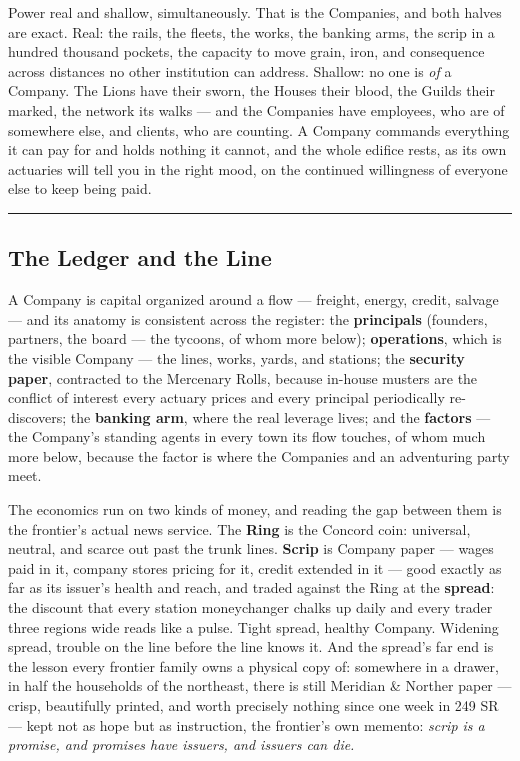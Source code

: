Power real and shallow, simultaneously. That is the Companies, and both halves are exact. Real: the rails, the fleets, the works, the banking arms, the scrip in a hundred thousand pockets, the capacity to move grain, iron, and consequence across distances no other institution can address. Shallow: no one is \textit{of} a Company. The Lions have their sworn, the Houses their blood, the Guilds their marked, the network its walks --- and the Companies have employees, who are of somewhere else, and clients, who are counting. A Company commands everything it can pay for and holds nothing it cannot, and the whole edifice rests, as its own actuaries will tell you in the right mood, on the continued willingness of everyone else to keep being paid.

\medskip\hrule\medskip

\subsection{The Ledger and the Line}

A Company is capital organized around a flow --- freight, energy, credit, salvage --- and its anatomy is consistent across the register: the \textbf{principals} (founders, partners, the board --- the tycoons, of whom more below); \textbf{operations}, which is the visible Company --- the lines, works, yards, and stations; the \textbf{security paper}, contracted to the Mercenary Rolls, because in-house musters are the conflict of interest every actuary prices and every principal periodically re-discovers; the \textbf{banking arm}, where the real leverage lives; and the \textbf{factors} --- the Company's standing agents in every town its flow touches, of whom much more below, because the factor is where the Companies and an adventuring party meet.

The economics run on two kinds of money, and reading the gap between them is the frontier's actual news service. The \textbf{Ring} is the Concord coin: universal, neutral, and scarce out past the trunk lines. \textbf{Scrip} is Company paper --- wages paid in it, company stores pricing for it, credit extended in it --- good exactly as far as its issuer's health and reach, and traded against the Ring at the \textbf{spread}: the discount that every station moneychanger chalks up daily and every trader three regions wide reads like a pulse. Tight spread, healthy Company. Widening spread, trouble on the line before the line knows it. And the spread's far end is the lesson every frontier family owns a physical copy of: somewhere in a drawer, in half the households of the northeast, there is still Meridian \& Norther paper --- crisp, beautifully printed, and worth precisely nothing since one week in 249 SR --- kept not as hope but as instruction, the frontier's own memento: \textit{scrip is a promise, and promises have issuers, and issuers can die.}

